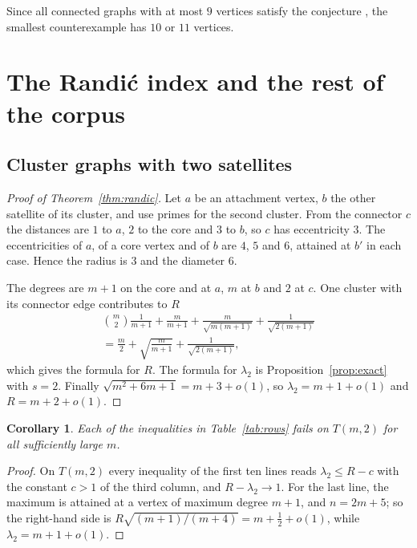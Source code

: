 \documentclass[11pt]{amsart}
\newtheorem{corollary}[theorem]{Corollary}
\theoremstyle{definition}
\theoremstyle{remark}
\begin{document}
Since all connected graphs with at most $9$ vertices satisfy the conjecture \cite{Cazenave},
the smallest counterexample has $10$ or $11$ vertices.

\section{The Randi\'c index and the rest of the corpus}\label{sec:randic}

\subsection{Cluster graphs with two satellites}

\begin{proof}[Proof of Theorem~\ref{thm:randic}]
Let $a$ be an attachment vertex, $b$ the other satellite of its cluster, and use primes for the
second cluster. From the connector $c$ the distances are $1$ to $a$, $2$ to the core and $3$ to
$b$, so $c$ has eccentricity $3$. The eccentricities of $a$, of a core vertex and of $b$ are
$4$, $5$ and $6$, attained at $b'$ in each case. Hence the radius is $3$ and the diameter $6$.

The degrees are $m+1$ on the core and at $a$, $m$ at $b$ and $2$ at $c$. One cluster with its
connector edge contributes to $R$
\begin{multline*}
\binom m2\frac{1}{m+1}+\frac{m}{m+1}+\frac{m}{\sqrt{m(m+1)}}+\frac{1}{\sqrt{2(m+1)}}\\
=\frac m2+\sqrt{\frac{m}{m+1}}+\frac{1}{\sqrt{2(m+1)}} ,
\end{multline*}
which gives the formula for $R$. The formula for $\lambda_2$ is Proposition~\ref{prop:exact}
with $s=2$. Finally $\sqrt{m^2+6m+1}=m+3+o(1)$, so $\lambda_2=m+1+o(1)$ and $R=m+2+o(1)$.
\end{proof}

\begin{corollary}\label{cor:rows}
Each of the inequalities in Table~\ref{tab:rows} fails on $T(m,2)$ for all sufficiently large
$m$.
\end{corollary}

\begin{proof}
On $T(m,2)$ every inequality of the first ten lines reads $\lambda_2\le R-c$ with the constant
$c>1$ of the third column, and $R-\lambda_2\to1$. For the last line, the maximum is attained at a
vertex of maximum degree $m+1$, and $n=2m+5$; so the right-hand side is
$R\sqrt{(m+1)/(m+4)}=m+\frac12+o(1)$, while $\lambda_2=m+1+o(1)$.
\end{proof}
\end{document}
